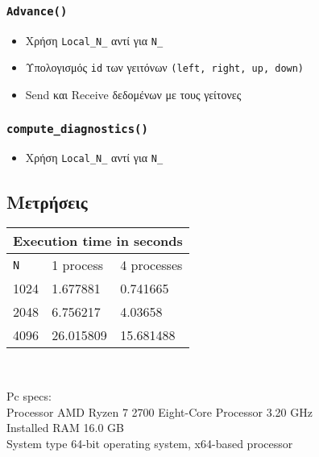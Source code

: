 \documentclass[11pt]{scrartcl} %
\begin{document}
        \subsubsection*{\texttt{Advance()}}
            \begin{itemize}
                \item Χρήση \texttt{Local\_N\_} αντί για \texttt{N\_}
                \item Υπολογισμός \texttt{id} των γειτόνων \texttt{(left, right, up, down)}
                \item Send και Receive δεδομένων με τους γείτονες
            \end{itemize}
        \subsubsection*{\texttt{compute\_diagnostics()}}
        \begin{itemize}
            \item Χρήση \texttt{Local\_N\_} αντί για \texttt{N\_}
        \end{itemize}
    
    \subsection*{Μετρήσεις}
        \begin{tabular}{|p{3cm}||p{3cm}|p{3cm}|}
            \hline
            \multicolumn{3}{|c|}{Execution time in seconds} \\
            \hline
            \texttt{N} & 1 process & 4 processes\\
            \hline
            1024 & 1.677881 & 0.741665\\
            2048 & 6.756217 & 4.03658\\
            4096 & 26.015809 & 15.681488\\
            \hline
        \end{tabular}\\
        \bigskip
        
            Pc specs:\\
                \hspace*{1cm} Processor AMD Ryzen 7 2700 Eight-Core Processor 3.20 GHz\\
                \hspace*{1cm} Installed RAM	16.0 GB\\
                \hspace*{1cm} System type	64-bit operating system, x64-based processor\\

        
\end{document}

